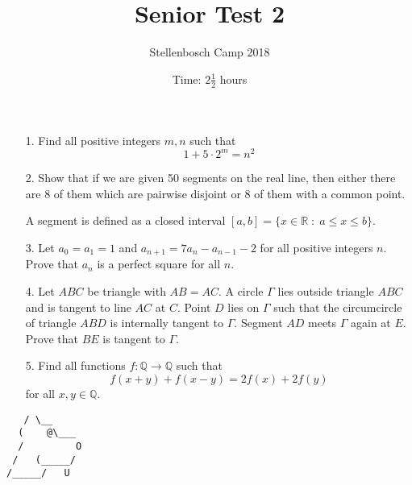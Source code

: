 \documentclass[a4paper, 12pt]{article}
\title{Senior Test 2}
\author{Stellenbosch Camp 2018}
\date{Time: $2 \frac{1}{2}$ hours}
\begin{document}
 \maketitle

\begin{enumerate}


\item[1.] Find all positive integers $m, n$ such that
\begin{equation*}
    1 + 5 \cdot 2^m = n^2
\end{equation*}

\item[2.]  Show that if we are given 50 segments on the real line, then either there are 8 of them which are pairwise disjoint or 8 of them with a common point. 

A segment is defined as a closed interval $[a, b] = \{x \in \mathbb{R} \;:\; a \leq x \leq b \}$.
\\


\item[3.] Let $a_0 = a_1 = 1$ and $a_{n+1} = 7 a_n - a_{n-1} - 2$ for all positive integers $n$. Prove that $a_n$ is a perfect square for all $n$. \\



\item[4.] Let $ABC$ be triangle with $AB = AC$. A circle $\Gamma$ lies outside triangle $ABC$ and is tangent to line $AC$ at $C$. Point $D$ lies on $\Gamma$ such that the circumcircle of triangle $ABD$ is internally tangent to $\Gamma$. Segment $AD$ meets $\Gamma$ again at $E$. Prove that $BE$ is tangent to $\Gamma$.  \\


\item[5.] Find all functions $f : \mathbb{Q} \to \mathbb{Q}$ such that
\begin{equation*}
    f(x+y) + f(x-y) = 2f(x) + 2f(y)
\end{equation*}
for all $x, y \in \mathbb{Q}$.


\end{enumerate}

\vfill

\centering
\begin{BVerbatim}
   / \__
  (    @\___
  /         O
 /   (_____/
/_____/   U
\end{BVerbatim}

\vspace{12mm}
\end{document}
